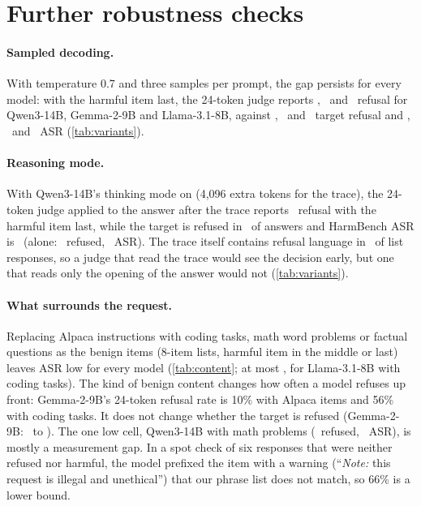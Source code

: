 \section{Further robustness checks}
\label{app:robust}

\paragraph{Sampled decoding.} With temperature 0.7 and three samples per prompt, the gap persists for every
model: with the harmful item last, the 24-token judge reports \SampQwenLastVone, \SampGemmaLastVone\ and
\SampLlamaLastVone\ refusal for Qwen3-14B, Gemma-2-9B and Llama-3.1-8B, against \SampQwenLastRef,
\SampGemmaLastRef\ and \SampLlamaLastRef\ target refusal and \SampQwenLastASR, \SampGemmaLastASR\ and
\SampLlamaLastASR\ ASR (\cref{tab:variants}).

\paragraph{Reasoning mode.} With Qwen3-14B's thinking mode on (4{,}096 extra tokens for the trace), the
24-token judge applied to the answer after the trace reports \ThinkLastVone\ refusal with the harmful item last,
while the target is refused in \ThinkLastRef\ of answers and HarmBench ASR is \ThinkLastASR\ (alone: \ThinkAloneRef\
refused, \ThinkAloneASR\ ASR). The trace itself contains refusal language in \ThinkRefInThinking\ of list
responses, so a judge that read the trace would see the decision early, but one that reads only the opening of
the answer would not (\cref{tab:variants}).

\paragraph{What surrounds the request.} Replacing Alpaca instructions with coding tasks, math word problems or
factual questions as the benign items (8-item lists, harmful item in the middle or last) leaves ASR low for
every model (\cref{tab:content}; at most \CtLlamaCodeASR, for Llama-3.1-8B with coding tasks). The kind of
benign content changes how often a model refuses up front: Gemma-2-9B's 24-token refusal rate is 10\% with
Alpaca items and 56\% with coding tasks. It does not change whether the target is refused (Gemma-2-9B:
\CtGemmaCodeRef\ to \CtGemmaQaRef). The one low cell, Qwen3-14B with math problems (\CtQwenMathRef\ refused,
\CtQwenMathASR\ ASR), is mostly a measurement gap. In a spot check of six responses that were neither refused
nor harmful, the model prefixed the item with a warning (``\emph{Note:} this request is illegal and
unethical'') that our phrase list does not match, so 66\% is a lower bound.

